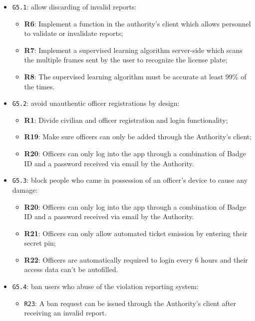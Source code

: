 \documentclass[12pt,a4paper]{article}
\begin{document}
	\begin{itemize}
	\item \texttt{G5.1}: allow discarding of invalid reports:
							\begin{itemize}
									\item \textbf{R6}: Implement a function in the authority's client which allows personnel to validate or invalidate reports;
									\item \textbf{R7}: Implement a supervised learning algorithm server-side which scans the multiple frames sent by the user to recognize the license plate;
									\item \textbf{R8}: The supervised learning algorithm must be accurate at least 99\% of the times.
							\end{itemize}
	\item \texttt{G5.2}: avoid unauthentic officer registrations by design:
							\begin{itemize}
									\item \textbf{R1}: Divide civilian and officer registration and login functionality;
									\item \textbf{R19}: Make sure officers can only be added through the Authority's client;
									\item \textbf{R20}: Officers can only log into the app through a combination of Badge ID and a password received via email by the Authority.
							\end{itemize}
	\item \texttt{G5.3}: block people who came in possession of an officer's device to cause any damage:
							\begin{itemize}
									\item \textbf{R20}: Officers can only log into the app through a combination of Badge ID and a password received via email by the Authority.
									\item \textbf{R21}: Officers can only allow automated ticket emission by entering their secret pin;
									\item \textbf{R22}: Officers are automatically required to login every 6 hours and their access data can't be autofilled.
							\end{itemize}
	\item \texttt{G5.4}: ban users who abuse of the violation reporting system:
							\begin{itemize}
									\item \texttt{R23}: A ban request can be issued through the Authority's client after receiving an invalid report.
							\end{itemize}
	\end{itemize}
	
\end{document}
